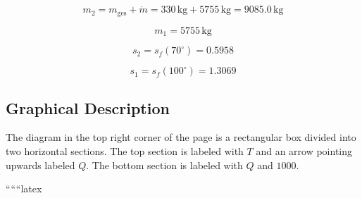 \[
m_2 = m_{\text{ges}} + \dot{m} = 330 \, \text{kg} + 5755 \, \text{kg} = 9085.0 \, \text{kg}
\]

\[
m_1 = 5755 \, \text{kg}
\]

\[
s_2 = s_f (70^\circ) = 0.5958
\]

\[
s_1 = s_f (100^\circ) = 1.3069
\]

\subsection*{Graphical Description}
The diagram in the top right corner of the page is a rectangular box divided into two horizontal sections. The top section is labeled with \( T \) and an arrow pointing upwards labeled \( Q \). The bottom section is labeled with \( Q \) and \( 1000 \).

``````latex


